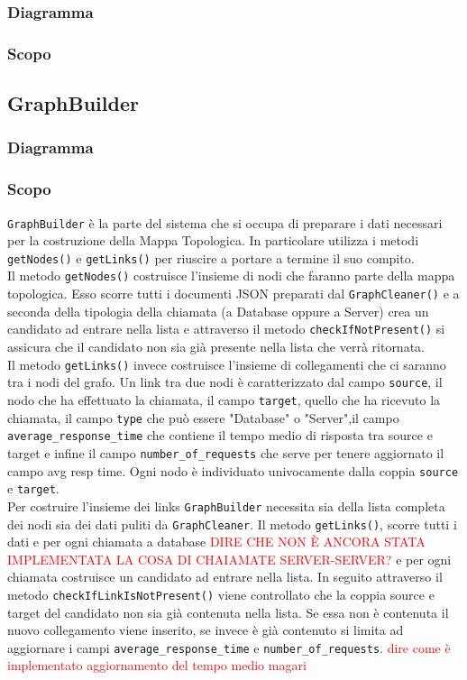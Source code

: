 	\subsubsection{Diagramma}

	\subsubsection{Scopo}
	
\subsection{GraphBuilder}
\label{sec:GraphBuilder}
	\subsubsection{Diagramma}

	\subsubsection{Scopo}
	\texttt{GraphBuilder} è la parte del sistema che si occupa di preparare i dati necessari per la costruzione della Mappa Topologica. In particolare utilizza i metodi \texttt{getNodes()} e \texttt{getLinks()} per riuscire a portare a termine il suo compito.\\
	Il metodo \texttt{getNodes()} costruisce l'insieme di nodi che faranno parte della mappa topologica. Esso scorre tutti i documenti JSON preparati dal \texttt{GraphCleaner()} e a seconda della tipologia della chiamata (a Database oppure a Server) crea un candidato ad entrare nella lista e attraverso il metodo \texttt{checkIfNotPresent()} si assicura che il candidato non sia già presente nella lista che verrà ritornata.\\
	Il metodo \texttt{getLinks()} invece costruisce l'insieme di collegamenti che ci saranno tra i nodi del grafo. Un link tra due nodi è caratterizzato dal campo \texttt{source}, il nodo che ha effettuato la chiamata, il campo \texttt{target}, quello che ha ricevuto la chiamata, il campo \texttt{type} che può essere "Database" o "Server",il campo \texttt{average\_response\_time} che contiene il tempo medio di risposta tra source e target e infine il campo \texttt{number\_of\_requests} che serve per tenere aggiornato il campo avg resp time. Ogni nodo è individuato univocamente dalla coppia \texttt{source} e \texttt{target}.\\	
	Per costruire l'insieme dei links \texttt{GraphBuilder} necessita sia della lista completa dei nodi sia dei dati puliti da \texttt{GraphCleaner}. Il metodo \texttt{getLinks()}, scorre tutti i dati e per ogni chiamata a database \textcolor{red}{DIRE CHE NON È ANCORA STATA IMPLEMENTATA LA COSA DI CHAIAMATE SERVER-SERVER?} e per ogni chiamata costruisce un candidato ad entrare nella lista. In seguito attraverso il metodo \texttt{checkIfLinkIsNotPresent()} viene controllato che la coppia source e target del candidato non sia già contenuta nella lista. Se essa non è contenuta il nuovo collegamento viene inserito, se invece è già contenuto si limita ad aggiornare i campi \texttt{average\_response\_time} e \texttt{number\_of\_requests}. \textcolor{red}{dire come è implementato aggiornamento del tempo medio magari}


